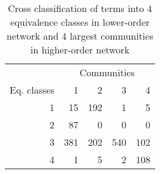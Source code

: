\begin{table}[ht]
\centering
\begin{tabular}{rrrrr}
  \hline
  & \multicolumn{4}{c}{ Communities } \\
 Eq. classes & 1 & 2 & 3 & 4 \\
 \hline
1 &  15 & 192 &   1 &   5 \\ 
  2 &  87 &   0 &   0 &   0 \\ 
  3 & 381 & 202 & 540 & 102 \\ 
  4 &   1 &   5 &   2 & 108 \\ 
   \hline
\end{tabular}
\caption[Cross-tabulation of 4-block model and communities]{Cross classification of terms into 4 equivalence classes in lower-order network and 4 largest communities in higher-order network} 
\label{tab:c3_global_block2}
\end{table}
